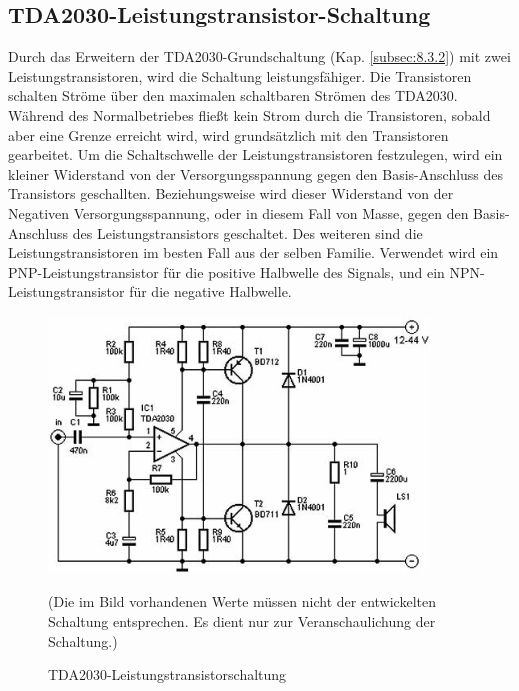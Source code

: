 \subsection{TDA2030-Leistungstransistor-Schaltung}\label{subsec:8.3.3}
Durch das Erweitern der TDA2030-Grundschaltung (Kap. \ref{subsec:8.3.2}) mit zwei Leistungstransistoren, wird die Schaltung leistungsfähiger.
Die Transistoren schalten Ströme über den maximalen schaltbaren Strömen des TDA2030. Während des Normalbetriebes fließt kein Strom durch die Transistoren, sobald aber eine Grenze erreicht wird, wird grundsätzlich mit den Transistoren gearbeitet.
Um die Schaltschwelle der Leistungstransistoren festzulegen, wird ein kleiner Widerstand von der Versorgungsspannung gegen den Basis-Anschluss des Transistors geschallten.
Beziehungsweise wird dieser Widerstand von der Negativen Versorgungsspannung, oder in diesem Fall von Masse, gegen den Basis-Anschluss des Leistungstransistors geschaltet.
Des weiteren sind die Leistungstransistoren im besten Fall aus der selben Familie.
Verwendet wird ein PNP-Leistungstransistor für die positive Halbwelle des Signals, und ein NPN-Leistungstransistor für die negative Halbwelle.
\begin{figure} [H]
	\centering
	\includegraphics[width=0.9\textwidth]{img/Grundlagen/TDA2030/TDA2030-Leistungstransschaltung.jpg}
	\caption[TDA2030-Leistungstransistorschaltung]{TDA2030-Leistungstransistorschaltung\footnotemark}
	\text (Die im Bild vorhandenen Werte müssen nicht der entwickelten Schaltung entsprechen. Es dient nur zur Veranschaulichung der Schaltung.)
	\label {fig:8.3.3.1}
\end{figure}

